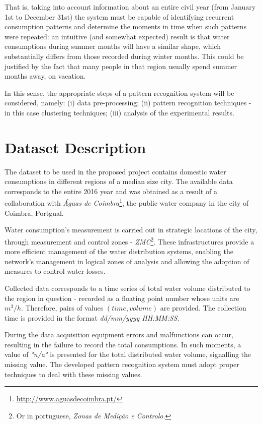 \documentclass[9pt,journal,compsoc]{IEEEtran}
\begin{document}
That is, taking into account information about an entire civil year (from January 1st to December 31st) the system must be capable of identifying recurrent consumption patterns and determine the moments in time when such patterns were repeated: an intuitive (and somewhat expected) result is that water consumptions during summer months will have a similar shape, which substantially differs from those recorded during winter months. This could be justified by the fact that many people in that region usually spend summer months away, on vacation.

In this sense, the appropriate steps of a pattern recognition system will be considered, namely: (i) data pre-processing; (ii) pattern recognition techniques - in this case clustering techniques; (iii) analysis of the experimental results.

\section{Dataset Description}
\label{dataset_description}

The dataset to be used in the proposed project contains domestic water consumptions in different regions of a median size city. The available data corresponds to the entire 2016 year and was obtained as a result of a collaboration with \emph{Águas de Coimbra}\footnote{\url{http://www.aguasdecoimbra.pt/}}, the public water company in the city of Coimbra, Portgual.

Water consumption's measurement is carried out in strategic locations of the city, through measurement and control zones - \emph{ZMC}\footnote{Or in portuguese, \emph{Zonas de Medição e Controlo}.}. These infrastructures provide a more efficient management of the water distribution systems, enabling the network's management in logical zones of analysis and allowing the adoption of measures to control water losses.

Collected data corresponds to a time series of total water volume distributed to the region in question - recorded as a floating point number whose units are $m^{3}/h$. Therefore, pairs of values $(time, volume)$ are provided. The collection time is provided in the format \emph{dd/mm/yyyy HH:MM:SS}.

During the data acquisition equipment errors and malfunctions can occur, resulting in the failure to record the total consumptions. In such moments, a value of \emph{"n/a"} is presented for the total distributed water volume, signalling the missing value. The developed pattern recognition system must adopt proper techniques to deal with these missing values.
\end{document}
